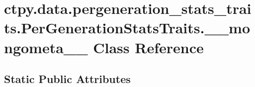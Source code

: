 \hypertarget{classctpy_1_1data_1_1pergeneration__stats__traits_1_1_per_generation_stats_traits_1_1____mongometa____}{\section{ctpy.\-data.\-pergeneration\-\_\-stats\-\_\-traits.\-Per\-Generation\-Stats\-Traits.\-\_\-\-\_\-mongometa\-\_\-\-\_\- Class Reference}
\label{classctpy_1_1data_1_1pergeneration__stats__traits_1_1_per_generation_stats_traits_1_1____mongometa____}
}
\subsection*{Static Public Attributes}

